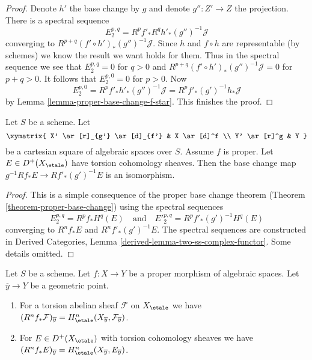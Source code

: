 \begin{proof}
\medskip\noindent
Denote $h'$ the base change by $g$ and denote $g'' : Z' \to Z$
the projection. There is a spectral sequence
$$
E_2^{p, q} = R^pf'_* R^qh'_* (g'')^{-1}\mathcal{J}
$$
converging to $R^{p + q}(f' \circ h')_*(g'')^{-1}\mathcal{J}$.
Since $h$ and $f \circ h$ are representable (by schemes)
we know the result we want holds for them. Thus in the
spectral sequence we see that $E_2^{p, q} = 0$ for $q > 0$
and $R^{p + q}(f' \circ h')_*(g'')^{-1}\mathcal{J} = 0$
for $p + q > 0$. It follows that $E_2^{p, 0} = 0$ for $p > 0$.
Now
$$
E_2^{p, 0} = R^pf'_* h'_* (g'')^{-1}\mathcal{J} =
R^pf'_* (g')^{-1}h_*\mathcal{J}
$$
by Lemma \ref{lemma-proper-base-change-f-star}. This finishes the proof.
\end{proof}

\begin{lemma}
\label{lemma-proper-base-change}
Let $S$ be a scheme. Let
$$
\xymatrix{
X' \ar[r]_{g'} \ar[d]_{f'} & X \ar[d]^f \\
Y' \ar[r]^g & Y
}
$$
be a cartesian square of algebraic spaces over $S$. Assume $f$ is proper.
Let $E \in D^+(X_\etale)$ have torsion cohomology sheaves.
Then the base change map $g^{-1}Rf_*E \to Rf'_*(g')^{-1}E$
is an isomorphism.
\end{lemma}

\begin{proof}
This is a simple consequence of the proper base change theorem
(Theorem \ref{theorem-proper-base-change}) using the spectral
sequences
$$
E_2^{p, q} = R^pf_*H^q(E)
\quad\text{and}\quad
{E'}_2^{p, q} = R^pf'_*(g')^{-1}H^q(E)
$$
converging to $R^nf_*E$ and $R^nf'_*(g')^{-1}E$.
The spectral sequences are constructed in
Derived Categories, Lemma \ref{derived-lemma-two-ss-complex-functor}.
Some details omitted.
\end{proof}

\begin{lemma}
\label{lemma-proper-base-change-stalk}
Let $S$ be a scheme.
Let $f : X \to Y$ be a proper morphism of algebraic spaces.
Let $\overline{y} \to Y$ be a geometric point.
\begin{enumerate}
\item For a torsion abelian sheaf $\mathcal{F}$ on $X_\etale$ we have
$(R^nf_*\mathcal{F})_{\overline{y}} =
H^n_\etale(X_{\overline{y}}, \mathcal{F}_{\overline{y}})$.
\item For $E \in D^+(X_\etale)$ with torsion cohomology sheaves we have
$(R^nf_*E)_{\overline{y}} = H^n_\etale(X_{\overline{y}}, E_{\overline{y}})$.
\end{enumerate}
\end{lemma}

